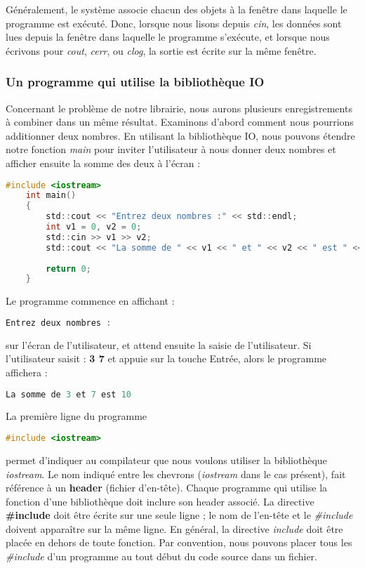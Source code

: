 Généralement, le système associe chacun des objets à la fenêtre dans laquelle le programme est exécuté. Donc, lorsque nous lisons depuis \textit{cin}, les données sont lues depuis la fenêtre dans laquelle le programme s'exécute, et lorsque nous écrivons pour \textit{cout}, \textit{cerr}, ou \textit{clog}, la sortie est écrite sur la même fenêtre.

\subsubsection{Un programme qui utilise la bibliothèque IO}
Concernant le problème de notre librairie,  nous aurons plusieurs enregistrements à combiner dans un même résultat. Examinons d'abord comment nous pourrions additionner deux nombres. En utilisant la bibliothèque IO, nous pouvons étendre notre fonction \textit{main} pour inviter l'utilisateur à nous donner deux nombres et afficher ensuite la somme des deux à l'écran :

	\medbreak
\begin{lstlisting}[language=C]
	#include <iostream>
	int main()
	{
		std::cout << "Entrez deux nombres :" << std::endl;
		int v1 = 0, v2 = 0;
		std::cin >> v1 >> v2;
		std::cout << "La somme de " << v1 << " et " << v2 << " est " << v1 + v2 << std::endl;
		
		return 0;
	}
\end{lstlisting}
\medbreak

Le programme commence en affichant :

\medbreak
\begin{lstlisting}[language=C]
	Entrez deux nombres :
\end{lstlisting}
\medbreak

sur l'écran de l'utilisateur, et attend ensuite la saisie de l'utilisateur. Si l'utilisateur saisit : \textbf{3 7} et appuie sur la touche Entrée, alors le programme affichera :

\medbreak
\begin{lstlisting}[language=C]
	La somme de 3 et 7 est 10
\end{lstlisting}
\medbreak

La première ligne du programme 

\medbreak
\begin{lstlisting}[language=C]
	#include <iostream>
\end{lstlisting}
\medbreak

permet d'indiquer au compilateur que nous voulons utiliser la bibliothèque \textit{iostream}. Le nom indiqué entre les chevrons (\textit{iostream} dans le cas présent), fait référence à un \textbf{header} (fichier d'en-tête). Chaque programme qui utilise la fonction d'une bibliothèque doit inclure son header associé. La directive \textbf{\#include} doit être écrite sur une seule ligne ; le nom de l'en-tête et le \textit{\#include} doivent apparaître sur la même ligne. En général, la directive \textit{include} doit être placée en dehors de toute fonction. Par convention, nous pouvons placer tous les \textit{\#include} d'un programme au tout début du code source dans un fichier.

